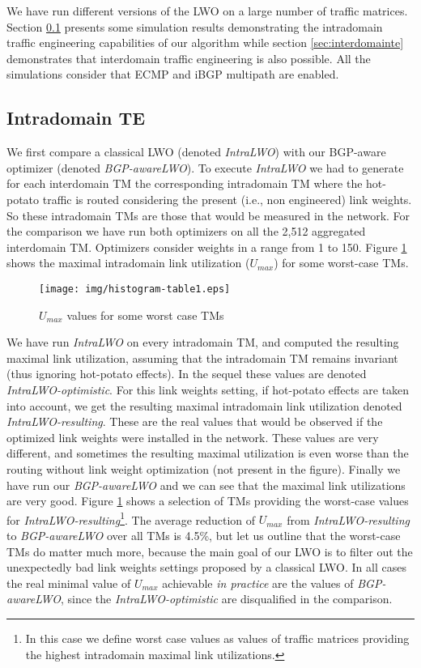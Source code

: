 \documentclass{acm_proc_article-sp}
\begin{document}
We have run different versions of the LWO on a large
number of traffic matrices. Section \ref{sec:intradomainte} presents
some simulation results demonstrating the intradomain traffic
engineering capabilities of our algorithm while section
\ref{sec:interdomainte} demonstrates that interdomain traffic
engineering is also possible. All the simulations consider that ECMP and
iBGP multipath are enabled.

\subsection{Intradomain TE}
\label{sec:intradomainte}

We first compare a classical LWO (denoted \textit{IntraLWO}) with
our BGP-aware optimizer (denoted \textit{BGP-awareLWO}). 
To execute \textit{IntraLWO} we had to generate for each interdomain TM the
corresponding intradomain TM where
the hot-potato traffic is routed considering the present (i.e., non engineered) link
weights. So these intradomain TMs
are those that would be measured in the network.
For the comparison we have run both
optimizers on all the 2,512 aggregated
interdomain TM. Optimizers consider weights in a range from 1 to 150.
Figure \ref{tab:resultumax} shows the maximal intradomain link
utilization ($U_{max}$) for some worst-case TMs. 

\begin{figure}[htbp]
  \centering
  \texttt{[image: img/histogram-table1.eps]}
  \caption{$U_{max}$ values for some worst case TMs}
  \label{tab:resultumax}
\end{figure}

We have run \textit{IntraLWO} on every intradomain TM, and computed the 
resulting maximal link utilization, assuming that the intradomain TM remains invariant 
(thus ignoring hot-potato effects). In the sequel these values are denoted
\textit{IntraLWO-optimistic}. For this link weights setting, if
hot-potato effects are taken into account, we get
the resulting maximal intradomain link utilization denoted
\textit{IntraLWO-resulting}. These are the real values that would be
observed if the optimized link weights were installed in the network. 
These values are very different, and sometimes the resulting maximal utilization
is even worse than the routing without link weight optimization (not present in the
figure). Finally we have run our \textit{BGP-awareLWO}
and we can see that the maximal link utilizations are very good. 
Figure \ref{tab:resultumax} shows a selection of TMs providing
the worst-case values for \textit{IntraLWO-resulting}\footnote{
    In this case we define worst case values as values of traffic matrices providing the highest
    intradomain maximal link utilizations.}. The average reduction of $U_{max}$
from \textit{IntraLWO-resulting} to \textit{BGP-awareLWO} over all TMs
is 4.5\%, but let us outline that the worst-case TMs do matter much more, because
the main goal of our LWO is to filter out the unexpectedly bad link weights settings proposed
by a classical LWO.
In all cases the real minimal value of $U_{max}$
achievable \textit{in practice} are the values of \textit{BGP-awareLWO}, since
the \textit{IntraLWO-optimistic} are disqualified in the comparison.
\end{document}

